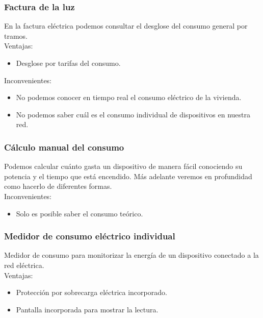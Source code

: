 \begin{titlepage}
\subsubsection{Factura de la luz}
En la factura eléctrica podemos consultar el desglose del consumo general por tramos.\\

Ventajas:
\begin{itemize}
	\item Desglose por tarifas del consumo.
\end{itemize}
Inconvenientes:
\begin{itemize}
	\item No podemos conocer en tiempo real el consumo eléctrico de la vivienda.
	\item No podemos saber cuál es el consumo individual de dispositivos en nuestra red.
\end{itemize}

\subsubsection{Cálculo manual del consumo}
Podemos calcular cuánto gasta un dispositivo de manera fácil conociendo su potencia y el tiempo que está encendido. Más adelante veremos en profundidad como hacerlo de diferentes formas.\\

Inconvenientes:\\
\begin{itemize}
	\item Solo es posible saber el consumo teórico.
\end{itemize}

\subsubsection{Medidor de consumo eléctrico individual}
Medidor de consumo para monitorizar la energía de un dispositivo conectado a la red eléctrica.\\

Ventajas:
\begin{itemize}
	\item Protección por sobrecarga eléctrica incorporado.
	\item Pantalla incorporada para mostrar la lectura.
\end{itemize}


\end{titlepage}
